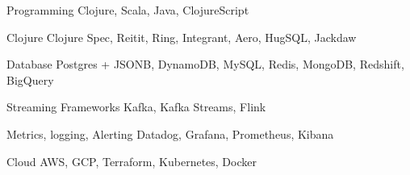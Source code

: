 

\begin{cvskills}

  \cvskill
    {Programming} %
    {Clojure, Scala, Java, ClojureScript} %
    
  \cvskill
    {Clojure} %
    {Clojure Spec, Reitit, Ring, Integrant, Aero, HugSQL, Jackdaw} %

  \cvskill
    {Database} %
    {Postgres + JSONB, DynamoDB, MySQL, Redis, MongoDB, Redshift, BigQuery} %

  \cvskill
    {Streaming Frameworks} %
    {Kafka, Kafka Streams, Flink} %

  \cvskill
    {Metrics, logging, Alerting} %
    {Datadog, Grafana, Prometheus, Kibana} %
    
  \cvskill
    {Cloud} %
    {AWS, GCP, Terraform, Kubernetes, Docker} %

\end{cvskills}